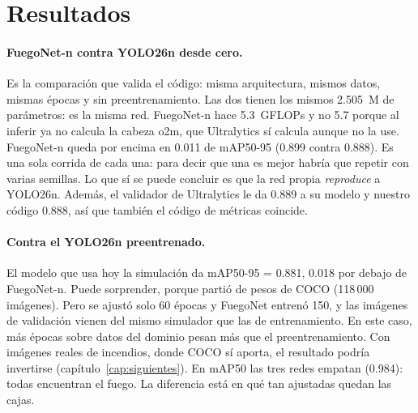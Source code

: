 \section{Resultados}

\begin{table}[H]
\centering\scriptsize
\setlength{\tabcolsep}{3.5pt}
\caption{Las tres redes medidas con el mismo código sobre las 600 imágenes de
validación. P y R con confianza $\ge0.25$ e IoU 0.5. Mediana de la latencia por imagen (lote 1,
incluye pre y posprocesamiento) en la RTX~5060~Ti y en CPU con 4 hilos.}
\label{tab:comparacion}
\end{table}

\paragraph{FuegoNet-n contra YOLO26n desde cero.} Es la comparación que valida
el código: misma arquitectura, mismos datos, mismas épocas y sin preentrenamiento.
Las dos tienen los mismos 2.505~M de parámetros: es la misma red.
FuegoNet-n hace 5.3~GFLOPs y no 5.7 porque al inferir ya no
calcula la cabeza o2m, que Ultralytics sí calcula aunque no la use. FuegoNet-n queda
por encima en 0.011 de mAP50-95
(0.899 contra 0.888). Es una sola corrida de cada una:
para decir que una es mejor habría que repetir con varias semillas. Lo que sí se
puede concluir es que la red propia \emph{reproduce} a YOLO26n. Además, el
validador de Ultralytics le da 0.889 a su modelo y nuestro código
0.888, así que también el código de métricas coincide.

\paragraph{Contra el YOLO26n preentrenado.} El modelo que usa hoy la simulación da
mAP50-95 = 0.881, 0.018 por debajo de
FuegoNet-n. Puede sorprender, porque partió de pesos de COCO (118\,000 imágenes).
Pero se ajustó solo 60 épocas y FuegoNet entrenó 150, y las imágenes de validación
vienen del mismo simulador que las de entrenamiento. En este caso, más épocas sobre
datos del dominio pesan más que el preentrenamiento. Con imágenes reales de
incendios, donde COCO sí aporta, el resultado podría invertirse
(capítulo~\ref{cap:siguientes}). En mAP50 las tres redes empatan
(0.984): todas encuentran el fuego. La diferencia está en qué tan
ajustadas quedan las cajas.

